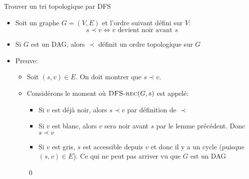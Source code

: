 \begin{frame}{Trouver un tri topologique par DFS}
\begin{itemize}
\item Soit un graphe $G=(V,E)$ et l'ordre suivant défini sur $V$:
$$s\prec v\Leftrightarrow v\mbox{ devient noir avant }s$$
\item Si $G$ est un DAG, alors $\prec$ définit un ordre topologique sur $G$

\bigskip

\item \alert{Preuve:}
\begin{itemize}
\item Soit $(s,v)\in E$. On doit montrer que $s\prec v$.
\item Considérons le moment où $\textnormal{\scshape DFS-rec}(G,s)$ est appelé:
\begin{itemize}
\item Si $v$ est déjà noir, alors $s\prec v$ par définition de $\prec$
\item Si $v$ est blanc, alors $v$ sera noir avant $s$ par le lemme
  précédent. Donc $s\prec v$
\item Si $v$ est gris, $s$ est accessible depuis $v$ et donc il y a un
  cycle (puisque $(s,v)\in E$). Ce qui ne peut pas arriver vu que $G$ est un DAG
\end{itemize}\qed
\end{itemize}
\end{itemize}
\end{frame}

